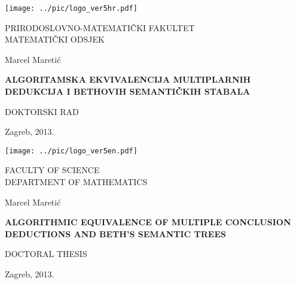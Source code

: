 \documentclass[a4paper,12pt]{article}
\begin{document}
 


\pagestyle{empty}



\begin{center}

\texttt{[image: ../pic/logo\_ver5hr.pdf]}

\fontsize{16pt}{30pt}\selectfont
 \textsf{PRIRODOSLOVNO-MATEMATIČKI FAKULTET\\ MATEMATIČKI ODSJEK}



\vspace*{2.5cm}
\textsf{Marcel Maretić}

\vspace*{2.5cm}
{\fontsize{22pt}{30pt}\selectfont
\textbf{
\textsf{ALGORITAMSKA EKVIVALENCIJA MULTIPLARNIH DEDUKCIJA I BETHOVIH SEMANTIČKIH STABALA}
}
}


\vspace*{3cm}
\textsf{DOKTORSKI RAD}

\vfill{
\textsf{Zagreb, 2013.}
}

\end{center}

\newpage


\thispagestyle{empty}

\begin{center}

\texttt{[image: ../pic/logo\_ver5en.pdf]}

\fontsize{16pt}{30pt}\selectfont
 \textsf{FACULTY OF SCIENCE\\ DEPARTMENT OF MATHEMATICS}



\vspace*{2.5cm}
{\fontsize{14pt}{16pt}\selectfont
\textsf{Marcel Maretić}
}

\vspace*{2.5cm}
{\fontsize{22pt}{30pt}\selectfont
\textbf{
\textsf{ALGORITHMIC EQUIVALENCE OF MULTIPLE CONCLUSION DEDUCTIONS AND BETH'S SEMANTIC TREES}
}
}


\vspace*{3cm}
\textsf{DOCTORAL THESIS}

\vfill{
\fontsize{14pt}{20pt}\selectfont
\textsf{Zagreb, 2013.}
}

\end{center}
\end{document}
